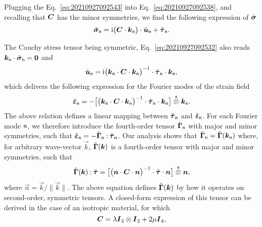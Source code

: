 Plugging the Eq.~\eqref{eq:20210927092543} into Eq.~\eqref{eq:20210927092538},
and recalling that \(\boldsymbol C\) has the minor symmetries, we find the following
expression of \(\tilde{\boldsymbol\sigma}\)
\begin{equation}
  \tilde{\boldsymbol\sigma}_\mathsf{n}
  =\mathrm i\bigl(\boldsymbol C\cdot\boldsymbol k_\mathsf{n}\bigr)\cdot\tilde{\boldsymbol u}_\mathsf{n}
  +\tilde{\boldsymbol\tau}_\mathsf{n}.
\end{equation}

The Cauchy stress tensor being symmetric, Eq.~\eqref{eq:20210927092532} also
reads \(\boldsymbol k_\mathsf{n}\cdot\tilde{\boldsymbol{\sigma}}_\mathsf{n}=\boldsymbol 0\) and
\begin{equation}
  \tilde{\boldsymbol u}_\mathsf{n}
  =\mathrm i\bigl(\boldsymbol k_\mathsf{n}\cdot\boldsymbol C\cdot\boldsymbol k_\mathsf{n}\bigr)^{-1}
  \cdot\tilde{\boldsymbol\tau}_\mathsf{n}\cdot\boldsymbol k_\mathsf{n},
\end{equation}
which delivers the following expression for the Fourier modes of the strain
field
\begin{equation}
  \tilde{\boldsymbol\varepsilon}_\mathsf{n}
  =-\bigl[\bigl(\boldsymbol k_\mathsf{n}\cdot\boldsymbol C\cdot\boldsymbol k_\mathsf{n}\bigr)^{-1}
  \cdot\tilde{\boldsymbol\tau}_\mathsf{n}\cdot\boldsymbol k_\mathsf{n}\bigr]
  \stackrel{\mathrm{s}}{\otimes}\boldsymbol k_\mathsf{n}.
\end{equation}
The above relation defines a linear mapping between
\(\tilde{\boldsymbol\tau}_\mathsf{n}\) and \(\tilde{\boldsymbol\varepsilon}_\mathsf{n}\). For
each Fourier mode \(\mathsf{n}\), we therefore introduce the fourth-order tensor
\(\tilde{\boldsymbol\Gamma}_\mathsf{n}\) with major and minor symmetries, such that
\(\tilde{\boldsymbol\varepsilon}_\mathsf{n}=-\tilde{\boldsymbol\Gamma}_\mathsf{n}\mathbin{\mathord{:}}{\tilde{\boldsymbol\tau}}_\mathsf{n}\). Our
analysis shows that
\(\tilde{\boldsymbol\Gamma}_\mathsf{n}=\hat{\boldsymbol\Gamma}(\boldsymbol k_\mathsf{n})\) where, for
arbitrary wave-vector \(\vec k\), \(\hat{\boldsymbol\Gamma}(\boldsymbol k)\) is a
fourth-order tensor with major and minor symmetries, such that
\begin{equation}
  \hat{\boldsymbol\Gamma}(\boldsymbol k)\mathbin{\mathord{:}}\tilde{\boldsymbol\tau}
  =\bigl[\bigl(\boldsymbol n\cdot\boldsymbol C\cdot\boldsymbol n\bigr)^{-1}
  \cdot\tilde{\boldsymbol\tau}\cdot\boldsymbol n\bigr]\stackrel{\mathrm{s}}{\otimes}\boldsymbol n,
\end{equation}
where \(\vec n=\vec k/\lVert\vec k\rVert\). The above equation defines
\(\hat{\boldsymbol\Gamma}(\boldsymbol k)\) by how it operates on second-order, symmetric
tensors. A closed-form expression of this tensor can be derived in the case of
an isotropic material, for which
\begin{equation}
  \boldsymbol C=\lambda\boldsymbol I_2\otimes\boldsymbol I_2+2\mu\boldsymbol I_4,
\end{equation}
